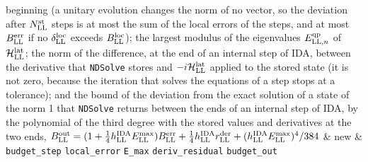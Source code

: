 \documentclass[
  10pt,
]{article}
\begin{document}
\begin{longtable}[]
beginning (a unitary evolution changes the norm of no vector, so the
deviation after \(N^{\rm st}_{\rm LL}\) steps is at most the sum of the
local errors of the steps, and at most \(B^{\rm err}_{\rm LL}\) if no
\(\delta^{\rm loc}_{\rm LL}\) exceeds \(B^{\rm loc}_{\rm LL}\)); the
largest modulus of the eigenvalues \(E^{\rm qp}_{{\rm LL},n}\) of
\(\mathcal H^{\rm lat}_{\rm LL}\); the norm of the difference, at the
end of an internal step of IDA, between the derivative that
\texttt{NDSolve} stores and \(-i\mathcal H^{\rm lat}_{\rm LL}\) applied
to the stored state (it is not zero, because the iteration that solves
the equations of a step stops at a tolerance); and the bound of the
deviation from the exact solution of a state of the norm 1 that
\texttt{NDSolve} returns between the ends of an internal step of IDA, by
the polynomial of the third degree with the stored values and
derivatives at the two ends,
\(B^{\rm out}_{\rm LL}=(1+\tfrac14h^{\rm IDA}_{\rm LL}E^{\rm max}_{\rm LL})B^{\rm err}_{\rm LL}+\tfrac14h^{\rm IDA}_{\rm LL}r^{\rm der}_{\rm LL}+(h^{\rm IDA}_{\rm LL}E^{\rm max}_{\rm LL})^4/384\)
& new & \texttt{budget\_step} \texttt{local\_error} \texttt{E\_max}
\texttt{deriv\_residual} \texttt{budget\_out} \\
\end{longtable}
\end{document}
